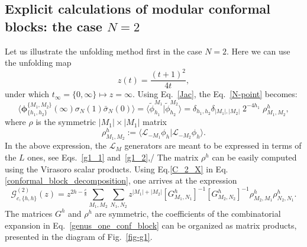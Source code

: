 \documentclass[a4paper,11pt]{article}
\begin{document}
 

\subsection{Explicit calculations of modular conformal blocks: the case $N=2$}
Let us illustrate the unfolding method first in the case $N=2$. Here  we can use the unfolding  map
\begin{equation}\label{g_one_covering_map}
 z(t)=\frac{(t+1)^2}{4t},
\end{equation}
under which  $t_{\infty}=\{0,\infty\}\mapsto z=\infty$.
Using Eq.~\eqref{Jac}, the  Eq.~\eqref{N-point}  becomes:
\begin{equation}\label{C_2_X}
 \langle \boldsymbol{\phi}^{\{M_1,M_2\}}_{\{h_1,h_2\}}(\infty) \sigma_{N}(1)\bar{\sigma}_{N}(0)\rangle=\langle \tilde{\phi}_{h_1}^{M_1} | \tilde{\phi}_{h_2}^{M_2}\rangle=
 \delta_{h_1, h_2}\delta_{|M_1|,|M_2|}\;2^{-4 h_1} \;\rho^h_{M_1,M_2},
\end{equation}
where $\rho$ is the symmetric $|M_1|\times|M_1|$ matrix
\begin{equation}
\label{rho}
 \rho^h_{M_1,M_2}:=\langle \mathcal{L}_{-M_1}\phi_{h}|\mathcal{L}_{-M_2}\phi_{h}\rangle.
\end{equation}
In the above expression,  the $\mathcal{L}_M$ generators are meant to be expressed in terms of the $L$  ones, see Eqs.~\eqref{g1_1} and~\eqref{g1_2},/ The matrix $\rho^h$  can be easily computed using the Virasoro scalar products.
Using Eq.\eqref{C_2_X} in Eq.\eqref{conformal_block_decomposition}, one arrives at the expression
\begin{equation}\label{genus_one_conf_block}
 \mathcal{G}_{c, \{h,h\}}^{(2)}(z)=z^{2h-\frac{c}{8}}\sum_{M_1, M_2}\sum_{N_1, N_2}
 z^{|M_1|+|M_2|}[G^{h}_{M_1,N_1}]^{-1}[G^{h}_{ M_2,N_2}]^{-1}
 \rho^h_{M_2,M_1}\rho^h_{N_2,N_1}.
\end{equation}
The matrices $G^h$ and $\rho^h$ are symmetric, the coefficients of the combinatorial 
expansion in Eq.~\eqref{genus_one_conf_block} can be organized as 
matrix products, presented in the diagram of Fig.~\ref{fig-g1}. 
\end{document}
